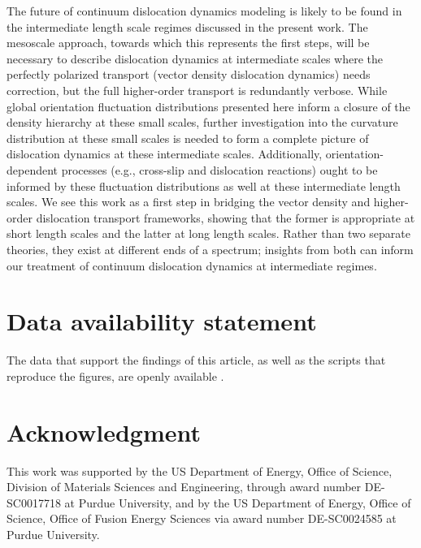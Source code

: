 The future of continuum dislocation dynamics modeling is likely to be found in the intermediate length scale regimes discussed in the present work. The mesoscale approach, towards which this represents the first steps, will be necessary to describe dislocation dynamics at intermediate scales where the perfectly polarized transport (vector density dislocation dynamics) needs correction, but the full higher-order transport is redundantly verbose. While global orientation fluctuation distributions presented here inform a closure of the density hierarchy at these small scales, further investigation into the curvature distribution at these small scales is needed to form a complete picture of dislocation dynamics at these intermediate scales. Additionally, orientation-dependent processes (e.g., cross-slip and dislocation reactions) ought to be informed by these fluctuation distributions as well at these intermediate length scales. We see this work as a first step in bridging the vector density and higher-order dislocation transport frameworks, showing that the former is appropriate at short length scales and the latter at long length scales. Rather than two separate theories, they exist at different ends of a spectrum; insights from both can inform our treatment of continuum dislocation dynamics at intermediate regimes.

\section*{Data availability statement}
The data that support the findings of this article, as well as the scripts that reproduce the figures, are openly available \cite{dataset}.

\section*{Acknowledgment}
This work was supported by the US Department of Energy, Office of Science, Division of Materials Sciences and Engineering, through award number DE-SC0017718 at Purdue University, and by the US Department of Energy, Office of Science, Office of Fusion Energy Sciences via award number DE-SC0024585 at Purdue University.
